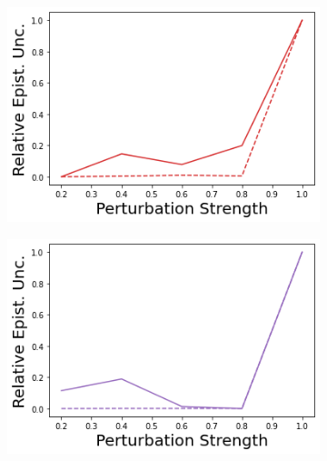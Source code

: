 \begin{figure}
    \begin{subfigure}{.245\textwidth}
        \includegraphics[width=\textwidth]{sections/011_icml2022/resources/transition_shift-DropOut-CartPoleShift-v0-mean_epistemic_uncertainty_.png}
    \end{subfigure}
    \begin{subfigure}{.245\textwidth}
        \includegraphics[width=\textwidth]{sections/011_icml2022/resources/transition_shift-Ensemble-CartPoleShift-v0-mean_epistemic_uncertainty_.png}
    \end{subfigure}
    \begin{subfigure}{.245\textwidth}

\end{subfigure}
\end{figure}
